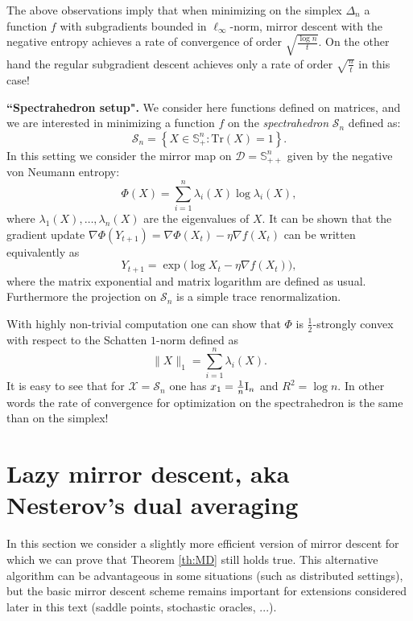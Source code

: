 The above observations imply that when minimizing on the simplex $\Delta_n$ a function $f$ with subgradients bounded in $\ell_{\infty}$-norm, mirror descent with the negative entropy achieves a rate of convergence of order $\sqrt{\frac{\log n}{t}}$. On the other hand the regular subgradient descent achieves only a rate of order $\sqrt{\frac{n}{t}}$ in this case!
\newline

\noindent
\textbf{``Spectrahedron setup".} We consider here functions defined on matrices, and we are interested in minimizing a function $f$ on the {\em spectrahedron} $\mathcal{S}_n$ defined as:
$$\mathcal{S}_n = \left\{X \in \mathbb{S}_+^n : \mathrm{Tr}(X) = 1 \right\} .$$
In this setting we consider the mirror map on $\mathcal{D} = \mathbb{S}_{++}^n$ given by the negative von Neumann entropy:
$$\Phi(X) = \sum_{i=1}^n \lambda_i(X) \log \lambda_i(X) ,$$
where $\lambda_1(X), \hdots, \lambda_n(X)$ are the eigenvalues of $X$. It can be shown that the gradient update $\nabla \Phi(Y_{t+1}) = \nabla \Phi(X_t) - \eta \nabla f(X_t)$ can be written equivalently as
$$Y_{t+1} = \exp\big(\log X_t - \eta \nabla f(X_t) \big) ,$$
where the matrix exponential and matrix logarithm are defined as usual. Furthermore the projection on $\mathcal{S}_n$ is a simple trace renormalization.

With highly non-trivial computation one can show that $\Phi$ is $\frac{1}{2}$-strongly convex with respect to the Schatten $1$-norm defined as
$$\|X\|_1 = \sum_{i=1}^n \lambda_i(X).$$
It is easy to see that for $\mathcal{X} = \mathcal{S}_n$ one has $x_1 = \frac{1}{n} \mathrm{I}_n$ and $R^2 = \log n$. In other words the rate of convergence for optimization on the spectrahedron is the same than on the simplex!

\section{Lazy mirror descent, aka Nesterov's dual averaging}
In this section we consider a slightly more efficient version of mirror descent for which we can prove that Theorem \ref{th:MD} still holds true. This alternative algorithm can be advantageous in some situations (such as distributed settings), but the basic mirror descent scheme remains important for extensions considered later in this text (saddle points, stochastic oracles, ...). 

